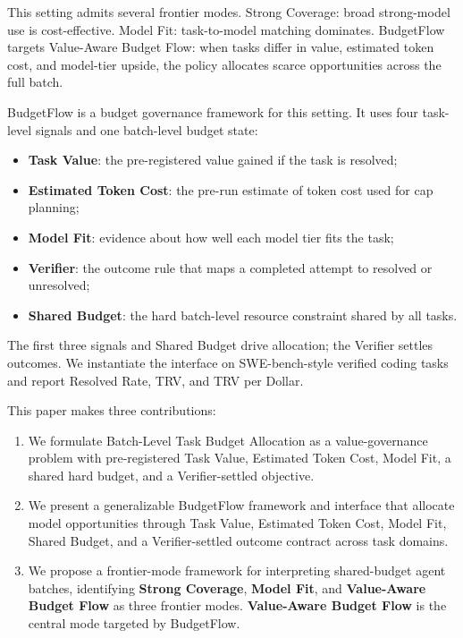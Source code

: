 \documentclass[letterpaper]{article}
\newcommand{\method}{BudgetFlow\xspace}
\newcommand{\trv}{TRV\xspace}
\newcommand{\taskvalue}{Task Value\xspace}
\newcommand{\tokencost}{Estimated Token Cost\xspace}
\newcommand{\modelfit}{Model Fit\xspace}
\newcommand{\sharedbudget}{Shared Budget\xspace}
\newcommand{\verifier}{Verifier\xspace}
\begin{document}
This setting admits several frontier modes. Strong Coverage: broad strong-model use is cost-effective. Model Fit: task-to-model matching dominates. \method targets Value-Aware Budget Flow: when tasks differ in value, estimated token cost, and model-tier upside, the policy allocates scarce opportunities across the full batch.

\method is a budget governance framework for this setting. It uses four task-level signals and one batch-level budget state:

\begin{itemize}
    \item \textbf{\taskvalue}: the pre-registered value gained if the task is resolved;
    \item \textbf{\tokencost}: the pre-run estimate of token cost used for cap planning;
    \item \textbf{\modelfit}: evidence about how well each model tier fits the task;
    \item \textbf{\verifier}: the outcome rule that maps a completed attempt to resolved or unresolved;
    \item \textbf{\sharedbudget}: the hard batch-level resource constraint shared by all tasks.
\end{itemize}

The first three signals and \sharedbudget drive allocation; the \verifier settles outcomes. We instantiate the interface on SWE-bench-style verified coding tasks and report Resolved Rate, \trv, and \trv per Dollar.

This paper makes three contributions:

\begin{enumerate}
    \item We formulate Batch-Level Task Budget Allocation as a value-governance problem with pre-registered \taskvalue, \tokencost, \modelfit, a shared hard budget, and a \verifier-settled objective.
    \item We present a generalizable \method framework and interface that allocate model opportunities through \taskvalue, \tokencost, \modelfit, \sharedbudget, and a \verifier-settled outcome contract across task domains.
    \item We propose a frontier-mode framework for interpreting shared-budget agent batches, identifying \textbf{Strong Coverage}, \textbf{Model Fit}, and \textbf{Value-Aware Budget Flow} as three frontier modes. \textbf{Value-Aware Budget Flow} is the central mode targeted by \method.
\end{enumerate}
\end{document}
